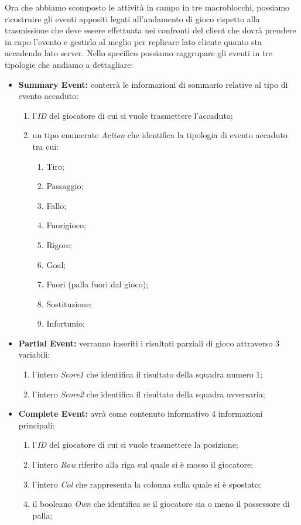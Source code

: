 \documentclass[aps,letterpaper,10pt]{article}
\begin{document}
Ora che abbiamo scomposto le attivit\`a in campo in tre macroblocchi, possiamo ricostruire gli eventi appositi legati all'andamento di gioco rispetto alla trasmissione che deve essere effettuata nei confronti del client che dovr\`a prendere in capo l'evento e gestirlo al meglio per replicare lato cliente quanto sta accadendo lato server. Nello specifico possiamo raggrupare gli eventi in tre tipologie che andiamo a dettagliare:

\begin{itemize}
	\item \textbf{Summary Event:} conterr\`a le informazioni di sommario relative al tipo di evento accaduto:
	\begin{enumerate}
		\item l'\emph{ID} del giocatore di cui si vuole trasmettere l'accaduto;
		\item un tipo enumerate \emph{Action} che identifica la tipologia di evento accaduto tra cui:
		\begin{enumerate}
			\item Tiro;
			\item Passaggio;
			\item Fallo;
			\item Fuorigioco;
			\item Rigore;
			\item Goal;
			\item Fuori (palla fuori dal gioco);
			\item Sostituzione;
			\item Infortunio;
		\end{enumerate}
	\end{enumerate}
	\item \textbf{Partial Event:} verranno inseriti i risultati parziali di gioco attraverso 3 variabili:
	\begin{enumerate}
		\item l'intero \emph{Score1} che identifica il risultato della squadra numero 1;
		\item l'intero \emph{Score2} che identifica il risultato della squadra avversaria;
	\end{enumerate}
	\item \textbf{Complete Event:} avr\`a come contenuto informativo 4 informazioni principali:
	\begin{enumerate}
		\item l'\emph{ID} del giocatore di cui si vuole trasmettere la posizione;
		\item l'intero \emph{Row} riferito alla riga sul quale si \`e mosso il giocatore;
		\item l'intero \emph{Col} che rappresenta la colonna sulla quale si \`e spostato;
		\item il booleano \emph{Own} che identifica se il giocatore sia o meno il possessore di palla;
	\end{enumerate}
\end{itemize}
\end{document}

